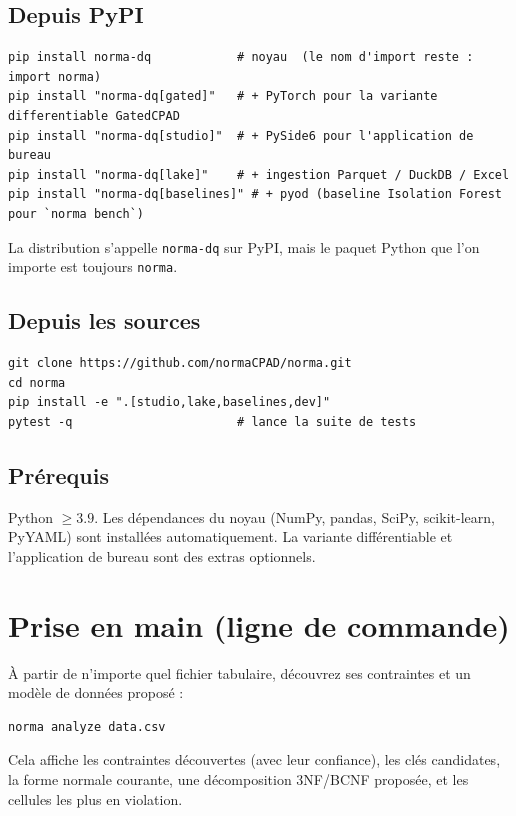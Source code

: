 \documentclass[11pt,a4paper]{article}
\newcommand{\code}[1]{\texttt{#1}}
\begin{document}
\subsection{Depuis PyPI}
\begin{lstlisting}
pip install norma-dq            # noyau  (le nom d'import reste : import norma)
pip install "norma-dq[gated]"   # + PyTorch pour la variante differentiable GatedCPAD
pip install "norma-dq[studio]"  # + PySide6 pour l'application de bureau
pip install "norma-dq[lake]"    # + ingestion Parquet / DuckDB / Excel
pip install "norma-dq[baselines]" # + pyod (baseline Isolation Forest pour `norma bench`)
\end{lstlisting}

\noindent La distribution s'appelle \code{norma-dq} sur PyPI, mais le paquet Python que
l'on importe est toujours \code{norma}.

\subsection{Depuis les sources}
\begin{lstlisting}
git clone https://github.com/normaCPAD/norma.git
cd norma
pip install -e ".[studio,lake,baselines,dev]"
pytest -q                       # lance la suite de tests
\end{lstlisting}

\subsection{Prérequis}
Python $\geq 3.9$. Les dépendances du noyau (NumPy, pandas, SciPy, scikit-learn, PyYAML)
sont installées automatiquement. La variante différentiable et l'application de bureau sont
des extras optionnels.

\section{Prise en main (ligne de commande)}
À partir de n'importe quel fichier tabulaire, découvrez ses contraintes et un modèle de
données proposé :
\begin{lstlisting}
norma analyze data.csv
\end{lstlisting}
Cela affiche les contraintes découvertes (avec leur confiance), les clés candidates, la
forme normale courante, une décomposition 3NF/BCNF proposée, et les cellules les plus en
violation.
\end{document}
